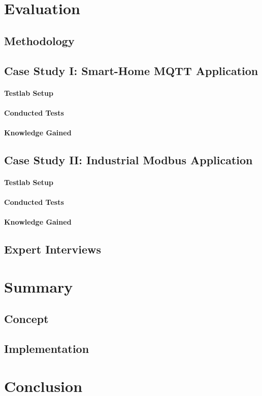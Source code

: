 \chapter{Evaluation}
\section{Methodology}
\section{Case Study I: Smart-Home MQTT Application}
\subsubsection{Testlab Setup}
\subsubsection{Conducted Tests}
\subsubsection{Knowledge Gained}
\section{Case Study II: Industrial Modbus Application}
\subsubsection{Testlab Setup}
\subsubsection{Conducted Tests}
\subsubsection{Knowledge Gained}
\section{Expert Interviews}

\chapter{Summary}
\section{Concept}
\section{Implementation}

\chapter{Conclusion}

